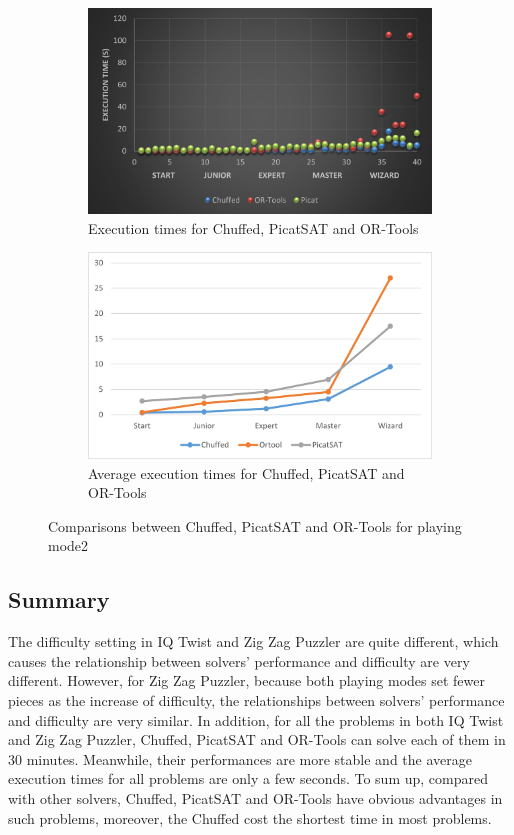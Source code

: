 \begin{figure}[H]
\begin{subfigure}[b]{0.48\textwidth}
  \centering
    \includegraphics[width=\textwidth]{figs/time2three.png}
    \caption{Execution times for Chuffed, PicatSAT and OR-Tools}
    \label{fig:compare}
\end{subfigure}
\begin{subfigure}[b]{0.48\textwidth}
 \centering
    \includegraphics[width=\textwidth]{figs/Threecomparison2.png}
    \caption{Average execution times for Chuffed, PicatSAT and OR-Tools}
    \label{fig:compare}
\end{subfigure}
\caption{Comparisons between Chuffed, PicatSAT and OR-Tools for playing mode2}
\label{fig:comparisonlast}
\end{figure}
\subsection{Summary}
\label{sec:Summary}
The difficulty setting in IQ Twist and Zig Zag Puzzler are quite different, which causes the relationship between solvers' performance and difficulty are very different. However, for Zig Zag Puzzler, because both playing modes set fewer pieces as the increase of difficulty, the relationships between solvers' performance and difficulty are very similar. In addition, for all the problems in both IQ Twist and Zig Zag Puzzler, Chuffed, PicatSAT and OR-Tools can solve each of them in 30 minutes. Meanwhile, their performances are more stable and the average execution times for all problems are only a few seconds. To sum up, compared with other solvers, Chuffed, PicatSAT and OR-Tools have obvious advantages in such problems, moreover, the Chuffed cost the shortest time in most problems. 
 